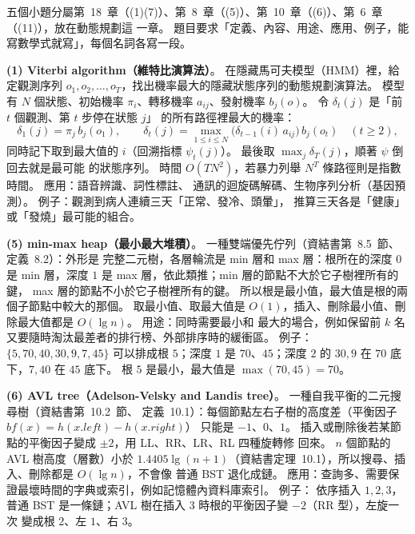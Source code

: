 \begin{pastsoln}
五個小題分屬第~18~章（(1)(7)）、第~8~章（(5)）、第~10~章（(6)）、第~6~章（(11)），放在動態規劃這
一章。 題目要求「定義、內容、用途、應用、例子，能寫數學式就寫」，每個名詞各寫一段。

\textbf{(1) Viterbi algorithm（維特比演算法）}。 在隱藏馬可夫模型（HMM）裡，給定觀測序列
$o_1, o_2, \ldots, o_T$，找出機率最大的隱藏狀態序列的動態規劃演算法。 模型有 $N$ 個狀態、初始機率
$\pi_i$、轉移機率 $a_{ij}$、發射機率 $b_j(o)$。 令 $\delta_t(j)$ 是「前 $t$ 個觀測、第 $t$ 步停在狀態 $j$」
的所有路徑裡最大的機率：
\[
\delta_1(j) = \pi_j\, b_j(o_1), \qquad
\delta_t(j) = \max_{1 \le i \le N} \bigl(\delta_{t-1}(i)\, a_{ij}\bigr)\, b_j(o_t) \quad (t \ge 2),
\]
同時記下取到最大值的 $i$（回溯指標 $\psi_t(j)$）。 最後取 $\max_j \delta_T(j)$，順著 $\psi$ 倒回去就是最可能
的狀態序列。 時間 $O(TN^2)$，若暴力列舉 $N^T$ 條路徑則是指數時間。 應用：語音辨識、詞性標註、
通訊的迴旋碼解碼、生物序列分析（基因預測）。 例子：觀測到病人連續三天「正常、發冷、頭暈」，
推算三天各是「健康」或「發燒」最可能的組合。

\textbf{(5) min-max heap（最小最大堆積）}。 一種雙端優先佇列（資結書第~8.5~節、定義~8.2）：外形是
完整二元樹，各層輪流是 min 層和 max 層：根所在的深度 $0$ 是 min 層，深度 $1$ 是 max 層，依此類推；min 層的節點不大於它子樹裡所有的鍵，
max 層的節點不小於它子樹裡所有的鍵。 所以根是最小值，最大值是根的兩個子節點中較大的那個。
取最小值、取最大值是 $O(1)$，插入、刪除最小值、刪除最大值都是 $O(\lg n)$。 用途：同時需要最小和
最大的場合，例如保留前 $k$ 名又要隨時淘汰最差者的排行榜、外部排序時的緩衝區。 例子：
$\{5, 70, 40, 30, 9, 7, 45\}$ 可以排成根 $5$；深度 $1$ 是 $70$、$45$；深度 $2$ 的 $30, 9$ 在 $70$ 底下，$7, 40$ 在
$45$ 底下。 根 $5$ 是最小，最大值是 $\max(70, 45) = 70$。

\textbf{(6) AVL tree（Adelson-Velsky and Landis tree）}。 一種自我平衡的二元搜尋樹（資結書第~10.2~節、
定義~10.1）：每個節點左右子樹的高度差（平衡因子 $\mathit{bf}(x) = h(x.\mathit{left}) - h(x.\mathit{right})$）
只能是 $-1$、$0$、$1$。 插入或刪除後若某節點的平衡因子變成 $\pm 2$，用 LL、RR、LR、RL 四種旋轉修
回來。 $n$ 個節點的 AVL 樹高度（層數）小於 $1.4405 \lg(n + 1)$（資結書定理~10.1），所以搜尋、插入、刪除都是 $O(\lg n)$，不會像
普通 BST 退化成鏈。 應用：查詢多、需要保證最壞時間的字典或索引，例如記憶體內資料庫索引。 例子：
依序插入 $1, 2, 3$，普通 BST 是一條鏈；AVL 樹在插入 $3$ 時根的平衡因子變 $-2$（RR 型），左旋一次
變成根 $2$、左 $1$、右 $3$。


\end{pastsoln}

